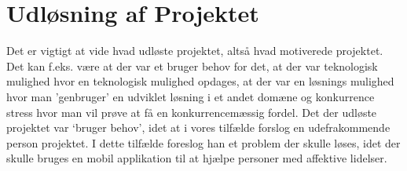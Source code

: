 \section{Udløsning af Projektet}
Det er vigtigt at vide hvad udløste projektet, altså hvad motiverede projektet. 
Det kan f.eks. være at der var et bruger behov for det, at der var teknologisk mulighed hvor en teknologisk mulighed opdages, at der var en løsnings mulighed hvor man 'genbruger' en udviklet løsning i et andet domæne og konkurrence stress hvor man vil prøve at få en konkurrencemæssig fordel. 
Det der udløste projektet var `bruger behov', idet at i vores tilfælde forslog en udefrakommende person projektet.
I dette tilfælde foreslog han et problem der skulle løses, idet der skulle bruges en mobil applikation til at hjælpe personer med affektive lidelser. 